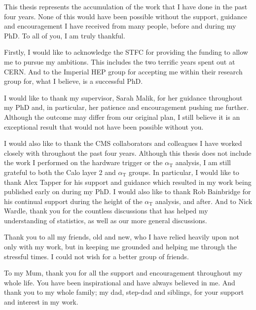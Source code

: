\begin{acknowledgements}

This thesis represents the accumulation of the work that I have done in the past four years. None of this would have been possible without the support, guidance and encouragement I have received from many people, before and during my PhD. To all of you, I am truly thankful.

Firstly, I would like to acknowledge the STFC for providing the funding to allow me to pursue my ambitions. This includes the two terrific years spent out at CERN. And to the Imperial HEP group for accepting me within their research group for, what I believe, is a successful PhD.

I would like to thank my supervisor, Sarah Malik, for her guidance throughout my PhD and, in particular, her patience and encouragement pushing me further. Although the outcome may differ from our original plan, I still believe it is an exceptional result that would not have been possible without you.

I would also like to thank the CMS collaborators and colleagues I have worked closely with throughout the past four years. Although this thesis does not include the work I performed on the hardware trigger or the $\alpha_{\mathrm{T}}$ analysis, I am still grateful to both the Calo layer 2 and $\alpha_{\mathrm{T}}$ groups. In particular, I would like to thank Alex Tapper for his support and guidance which resulted in my work being published early on during my PhD. I would also like to thank Rob Bainbridge for his continual support during the height of the $\alpha_{\mathrm{T}}$ analysis, and after. And to Nick Wardle, thank you for the countless discussions that has helped my understanding of statistics, as well as our more general discussions.

Thank you to all my friends, old and new, who I have relied heavily upon not only with my work, but in keeping me grounded and helping me through the stressful times. I could not wish for a better group of friends.

To my Mum, thank you for all the support and encouragement throughout my whole life. You have been inspirational and have always believed in me. And thank you to my whole family; my dad, step-dad and siblings, for your support and interest in my work.
    
\end{acknowledgements}